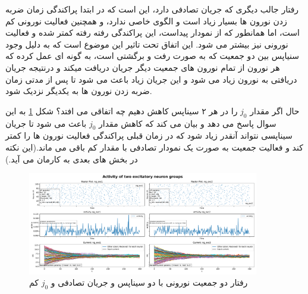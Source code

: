             رفتار جالب دیگری که جریان تصادفی دارد، این است که در ابتدا پراکندگی زمان ضربه زدن نورون ها بسیار زیاد است و الگوی خاصی ندارد، و همچنین فعالیت نورونی کم است، اما همانطور که از نمودار پیداست، این پراکندگی رفته رفته کمتر شده و فعالیت نورونی نیز بیشتر می شود. این اتفاق تحت تاثیر این موضوع است که به دلیل وجود سنیاپس بین دو جمعیت که به صورت رفت و برگشتی است، به گونه ای عمل کرده که هر نورون از تمام نورون های جمعیت دیگر جریان دریافت میکند و درنتیجه جریان دریافتی به نورون زیاد می شود و این جریان زیاد باعث می شود تا پس از مدتی زمان ضربه زدن نورون ها به یکدیگر نزدیک شود.

            حال اگر مقدار 
            $j_0$ 
            را در هر ۲ سیناپس کاهش دهیم چه اتفاقی می افتد؟ شکل 
            \ref{fig:part2-two-ng-full-synapse-low-j-rand-curr}
            به این سوال پاسخ می دهد و بیان می کند که کاهش مقدار 
            $j_0$ 
            باعث می شود تا جریان سیناپسی نتواند آنقدر زیاد شود که در زمان قبلی پراکندگی فعالیت نورون ها را کمتر کند و فعالیت جمعیت به صورت یک نمودار تصادفی با مقدار کم باقی می ماند.(این نکته در بخش های بعدی به کارمان می آید.)
            \begin{figure}[!ht]
                \centering
                \includegraphics[width=0.9\textwidth]{plots/part2-two-ng-full-synapse-low-j-rand-curr.pdf} 
                \caption{رفتار دو جمعیت نورونی با دو سیناپس و جریان تصادفی و $j_0$ کم}
                \label{fig:part2-two-ng-full-synapse-low-j-rand-curr}
            \end{figure}

